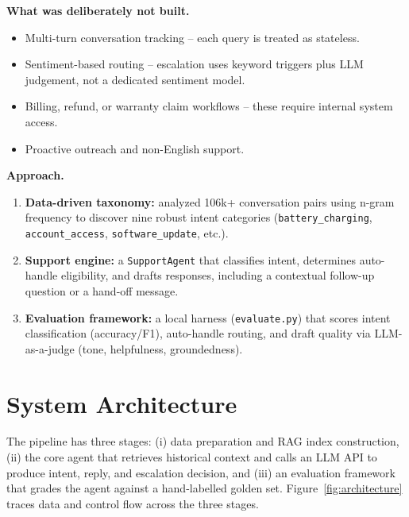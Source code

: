 \documentclass[11pt]{article}
\begin{document}
\textbf{What was deliberately not built.}
\begin{itemize}
  \item Multi-turn conversation tracking -- each query is treated as stateless.
  \item Sentiment-based routing -- escalation uses keyword triggers plus LLM judgement, not a dedicated sentiment model.
  \item Billing, refund, or warranty claim workflows -- these require internal system access.
  \item Proactive outreach and non-English support.
\end{itemize}

\textbf{Approach.}
\begin{enumerate}
  \item \textbf{Data-driven taxonomy:} analyzed 106k+ conversation pairs using n-gram frequency to discover nine robust intent categories (\texttt{battery\_charging}, \texttt{account\_access}, \texttt{software\_update}, etc.).
  \item \textbf{Support engine:} a \texttt{SupportAgent} that classifies intent, determines auto-handle eligibility, and drafts responses, including a contextual follow-up question or a hand-off message.
  \item \textbf{Evaluation framework:} a local harness (\texttt{evaluate.py}) that scores intent classification (accuracy/F1), auto-handle routing, and draft quality via LLM-as-a-judge (tone, helpfulness, groundedness).
\end{enumerate}

\section{System Architecture}

The pipeline has three stages: (i) data preparation and RAG index construction, (ii) the core agent that retrieves historical context and calls an LLM API to produce intent, reply, and escalation decision, and (iii) an evaluation framework that grades the agent against a hand-labelled golden set. Figure~\ref{fig:architecture} traces data and control flow across the three stages.
\end{document}
